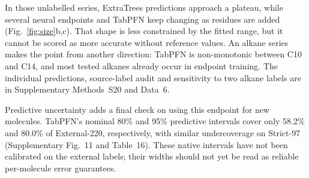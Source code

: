 In those unlabelled series, ExtraTrees predictions approach a
plateau, while several neural endpoints and TabPFN keep changing as residues
are added (Fig.~\ref{fig:size}b,c). That shape is less constrained by the fitted
range, but it cannot be scored as more accurate without reference values.
An alkane series makes the point from another direction: TabPFN is non-monotonic
between C10 and C14, and most tested alkanes already occur in endpoint training.
The individual predictions, source-label audit and sensitivity to two alkane
labels are in Supplementary Methods~S20 and Data~6.

Predictive uncertainty adds a final check on using this endpoint for new
molecules. TabPFN's nominal 80\% and 95\% predictive intervals cover only
58.2\% and 80.0\% of External-220, respectively, with similar undercoverage
on Strict-97 (Supplementary Fig.~11 and Table~16). These native intervals have
not been calibrated on the external labels; their widths should not yet be
read as reliable per-molecule error guarantees.
